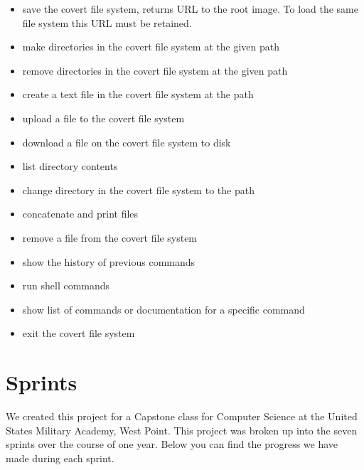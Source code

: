 \documentclass[letterpaper,12pt,openany,oneside]{sphinxmanual}
\begin{document}
\begin{itemize}
\begin{itemize}
\item {} 
 save the covert file system, returns URL to the root image. To load the same file system this URL must be retained.

\item {} 
 make directories in the covert file system at the given path

\item {} 
 remove directories in the covert file system at the given path

\item {} 
 create a text file in the covert file system at the path

\item {} 
 upload a file to the covert file system

\item {} 
 download a file on the covert file system to disk

\item {} 
 list directory contents

\item {} 
 change directory in the covert file system to the path

\item {} 
 concatenate and print files

\item {} 
 remove a file from the covert file system

\item {} 
 show the history of previous commands

\item {} 
 run shell commands

\item {} 
 show list of commands or documentation for a specific command

\item {} 
 exit the covert file system

\end{itemize}

\end{itemize}


\chapter{Sprints}
\label{index:sprints}
We created this project for a Capstone class for Computer Science at the United States Military Academy, West Point. This project was broken up into the seven sprints over the course of one year. Below you can find the progress we have made during each sprint.
\end{document}
